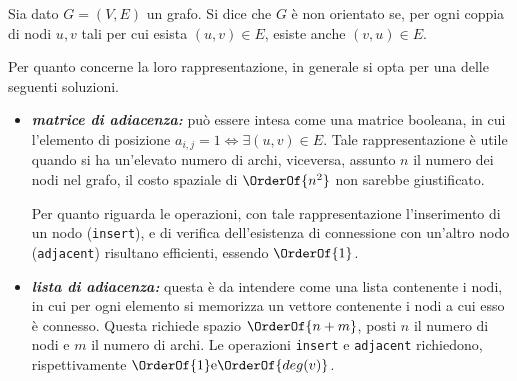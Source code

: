 \documentclass{subfiles}
\begin{document}
Sia dato \(G = (V, E)\) un grafo. Si dice che \(G\) è non orientato se,
per ogni coppia di nodi \(u, v\) tali per cui esista \((u, v) \in E\), esiste anche \((v, u) \in E\).

Per quanto concerne la loro rappresentazione, in generale si opta per una delle seguenti soluzioni.
\begin{itemize}
    \item \emph{\textbf{matrice di adiacenza:}} può essere intesa come una matrice booleana,
          in cui l'elemento di posizione \(a_{i,j} = 1 \iff \exists (u, v) \in E\).
          Tale rappresentazione è utile quando si ha un'elevato numero di archi, viceversa, assunto \(n\) il numero dei nodi nel grafo,
          il costo spaziale di \(\OrderOf{n^{2}}\) non sarebbe giustificato.

          Per quanto riguarda le operazioni, con tale rappresentazione l'inserimento di un nodo (\lstinline{insert}),
          e di verifica dell'esistenza di connessione con un'altro nodo (\lstinline{adjacent}) risultano efficienti, essendo \(\OrderOf{1}\).

    \item \emph{\textbf{lista di adiacenza:}} questa è da intendere come una lista contenente i nodi,
          in cui per ogni elemento si memorizza un vettore contenente i nodi a cui esso è connesso.
          Questa richiede spazio \(\OrderOf{n + m}\), posti \(n\) il numero di nodi e \(m\) il numero di archi.
          Le operazioni \lstinline{insert} e \lstinline{adjacent} richiedono, rispettivamente \(\OrderOf{1} \text{e} \OrderOf{deg(v)}\).
\end{itemize}
\end{document}
